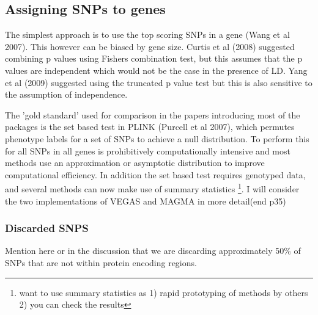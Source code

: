 

\subsection{Assigning SNPs to genes}

The simplest approach is to use the top scoring SNPs in a gene (Wang et al 2007). This however can be biased by gene size. Curtis et al (2008) suggested combining p values using Fishers combination test, but this assumes that the p values are independent which would not be the case in the presence of LD. Yang et al (2009)
suggested using the truncated p value test but this is also sensitive to the assumption of independence. 

The 'gold standard' used for comparison in the papers introducing most of the packages is the set based test in PLINK (Purcell et al 2007), which permutes phenotype labels for a set of SNPs to achieve a null distribution. To perform this for all SNPs in all genes is prohibitively computationally intensive and most methods use an approximation or asymptotic distribution to improve computational efficiency. In addition the set based test requires genotyped data, and several methods can now make use of summary statistics \footnote{want to use summary statistics as 1) rapid prototyping of methods by others 2) you can check the results}. I will consider the two implementations of VEGAS and MAGMA in more detail(end p35)

\subsubsection{Discarded SNPS}
Mention here or in the discussion that we are discarding approximately 50\% of SNPs that are not within protein encoding regions. 

